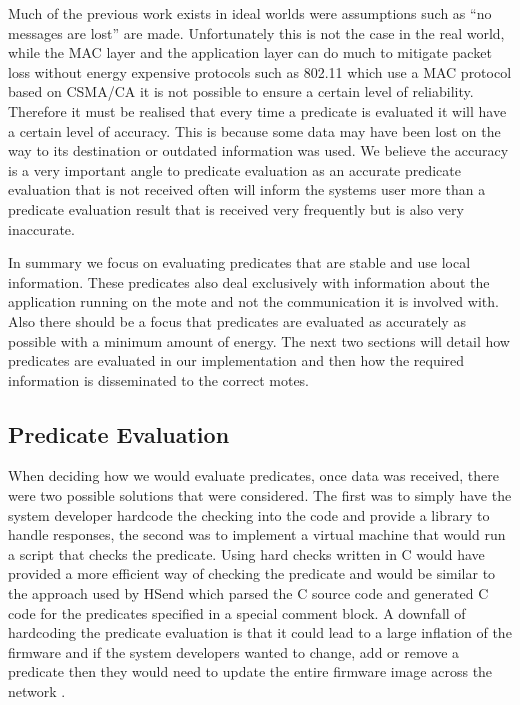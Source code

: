 Much of the previous work exists in ideal worlds were assumptions such as ``no messages are lost'' \cite{277788} are made. Unfortunately this is not the case in the real world, while the MAC layer and the application layer can do much to mitigate packet loss \cite{Buettner:2006:XSP:1182807.1182838} without energy expensive protocols such as 802.11 which use a MAC protocol based on CSMA/CA \cite{1028874} it is not possible to ensure a certain level of reliability. Therefore it must be realised that every time a predicate is evaluated it will have a certain level of accuracy. This is because some data may have been lost on the way to its destination or outdated information was used. We believe the accuracy is a very important angle to predicate evaluation as an accurate predicate evaluation that is not received often will inform the systems user more than a predicate evaluation result that is received very frequently but is also very inaccurate.

In summary we focus on evaluating predicates that are stable and use local information. These predicates also deal exclusively with information about the application running on the mote and not the communication it is involved with. Also there should be a focus that predicates are evaluated as accurately as possible with a minimum amount of energy. The next two sections will detail how predicates are evaluated in our implementation and then how the required information is disseminated to the correct motes.

\subsection{Predicate Evaluation}

When deciding how we would evaluate predicates, once data was received, there were two possible solutions that were considered. The first was to simply have the system developer hardcode the checking into the code and provide a library to handle responses, the second was to implement a virtual machine that would run a script that checks the predicate. Using hard checks written in C would have provided a more efficient way of checking the predicate and would be similar to the approach used by HSend \cite{herbert2007adaptive} which parsed the C source code and generated C code for the predicates specified in a special comment block. A downfall of hardcoding the predicate evaluation is that it could lead to a large inflation of the firmware and if the system developers wanted to change, add or remove a predicate then they would need to update the entire firmware image across the network \cite{Dunkels:2006:RDL:1182807.1182810,1437066}.

